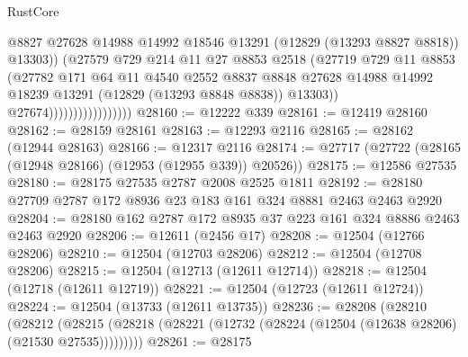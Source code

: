 \begin{lexlean}{RustCore}
\begin{coremodule}
                                        @8827
                                        @27628
                                        @14988
                                        @14992
                                        @18546
                                        @13291
                                        (@12829 (@13293 @8827 @8818))
                                        @13303))
                                    (@27579
                                      @729
                                      @214
                                      @11
                                      @27
                                      @8853
                                      @2518
                                      (@27719
                                        @729
                                        @11
                                        @8853
                                        (@27782
                                          @171
                                          @64
                                          @11
                                          @4540
                                          @2552
                                          @8837
                                          @8848
                                          @27628
                                          @14988
                                          @14992
                                          @18239
                                          @13291
                                          (@12829 (@13293 @8848 @8838))
                                          @13303))
                                      @27674)))))))))))))))))
@28160 := @12222 @339
@28161 := @12419 @28160
@28162 := @28159 @28161
@28163 := @12293 @2116
@28165 := @28162 (@12944 @28163)
@28166 := @12317 @2116
@28174 := @27717 (@27722 (@28165 (@12948 @28166) (@12953 (@12955 @339)) @20526))
@28175 := @12586 @27535
@28180 := @28175 @27535 @2787 @2008 @2525 @1811
@28192 := @28180 @27709 @2787 @172 @8936 @23 @183 @161 @324 @8881 @2463 @2463 @2920
@28204 := @28180 @162 @2787 @172 @8935 @37 @223 @161 @324 @8886 @2463 @2463 @2920
@28206 := @12611 (@2456 @17)
@28208 := @12504 (@12766 @28206)
@28210 := @12504 (@12703 @28206)
@28212 := @12504 (@12708 @28206)
@28215 := @12504 (@12713 (@12611 @12714))
@28218 := @12504 (@12718 (@12611 @12719))
@28221 := @12504 (@12723 (@12611 @12724))
@28224 := @12504 (@13733 (@12611 @13735))
@28236 := @28208
    (@28210
      (@28212
        (@28215 (@28218 (@28221 (@12732 (@28224 (@12504 (@12638 @28206) (@21530 @27535)))))))))
@28261 := @28175

\end{coremodule}
\end{lexlean}
